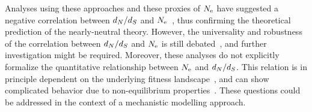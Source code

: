\documentclass{article}
\begin{document}
    Analyses using these approaches and these proxies of $N_{\text{e}}$ have suggested a negative correlation between $d_N / d_S$ and $N_{\text{e}}$~\citep{Popadin2007, Lanfear2010, Lartillot2011, Lartillot2012, Romiguier2014, Figuet2017}, thus confirming the theoretical prediction of the {nearly-neutral} theory.
    However, the universality and robustness of the correlation between $d_N / d_S$ and $N_{\text{e}}$ is still debated~\citep{Nabholz2013,Lanfear2014,Figuet2016, Bolivar2019}, and further investigation might be required.
    Moreover, these analyses do not explicitly formalize the quantitative relationship between $N_{\text{e}}$ and $d_N / d_S$.
    This relation is in principle dependent on the underlying fitness landscape~\citep{Welch2008, Cherry1998, Goldstein2011}, and can show complicated behavior due to non-equilibrium properties~\citep{Jones2016}.
    These questions could be addressed in the context of a mechanistic modelling approach.
\end{document}
